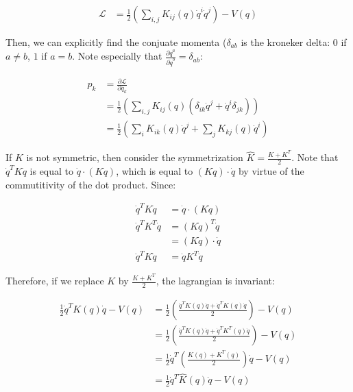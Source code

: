 \documentclass{article}
\begin{document}
\begin{align}
	\mathcal{L} & = \frac12 \left( \sum_{i, j} K_{ij}(q) \dot{q}^i \dot{q}^j \right)
		 - V(q) \nonumber
\end{align}

Then, we can explicitly find the conjuate momenta ($\delta_{ab}$ is the
	kroneker delta: $0$ if $a \neq b$, $1$ if $a = b$.
Note especially that $\frac{ \partial \dot{q}^a}{\partial \dot{q}^b} = \delta_{a b}$:

\begin{align}
	p_k & = \frac {\partial \mathcal{L}}{\partial \dot{q_k}} \nonumber \\
	& = \frac12 \left( \sum_{i,j} K_{ij}(q) 
		\left( \delta_{i k} \dot{q}^j + \dot{q}^i \delta_{j k} \right) \right) 
		\nonumber \\
	& = \frac12 \left( \sum_i K_{i k} (q) \dot{q}^j 
		+ \sum_j K_{k j} (q) \dot{q}^i \right) \label{eq-halfway-momentum}
\end{align}

If $K$ is not symmetric, then consider the symmetrization $\hat{K} = \frac{ K + K^T}2$.
Note that $\dot{q}^T K \dot{q}$ is equal to $\dot{q} \cdot \left( K \dot{q} \right)$,
	which is equal to $\left( K \dot{q} \right) \cdot \dot{q}$ by virtue
	of the commutitivity of the dot product.
Since:

\begin{align}
	\dot{q}^T K \dot{q} & = \dot{q} \cdot \left( K \dot{q} \right) \nonumber \\
	\dot{q}^T K^T \dot{q} & = \left( K \dot{q} \right)^T \dot{q} \nonumber \\
		& = \left(K \dot{q} \right) \cdot \dot{q} \nonumber \\
	\dot{q}^T K \dot{q} & = \dot{q} K^T \dot{q}
\end{align}

Therefore, if we replace $K$ by $\frac{K+ K^T}2$, the lagrangian is invariant:

\begin{align}
	\frac12 \dot{q}^T K(q) \dot{q} - V(q)
		& = \frac12 \left( 
			\frac{\dot{q}^T K(q) \dot{q} + \dot{q}^T K(q) \dot{q}}2 \right)
		- V(q) \nonumber \\
		& = \frac12 \left( 
			\frac{\dot{q}^T K(q) \dot{q} + \dot{q}^T K^T(q) \dot{q}}2 \right)
		- V(q) \nonumber \\
		& = \frac12 \dot{q}^T \left( 
			\frac{K(q) + K^T(q)}2 \right) \dot{q}
		- V(q) \nonumber \\
		& = \frac12 \dot{q}^T \hat{K}(q) \dot{q}
		- V(q) \nonumber \\
\end{align}
\end{document}
